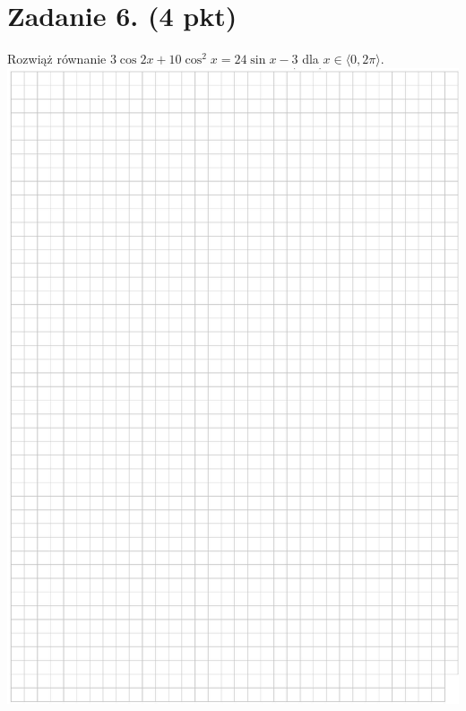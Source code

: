 \documentclass[10pt]{article}
\begin{document}
\section*{Zadanie 6. (4 pkt)}
Rozwiąż równanie \(3 \cos 2 x+10 \cos ^{2} x=24 \sin x-3\) dla \(x \in\langle 0,2 \pi\rangle\).\\
\includegraphics[max width=\textwidth, center]{2024_11_21_ebf83f11df6f4915f701g-08}\\
\end{document}
